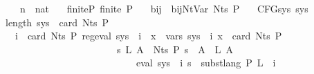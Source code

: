 \begin{isabellebody}
\ \ \ {\isasymgamma}{\isacharprime}{\kern0pt}\ {\isacharcolon}{\kern0pt}{\isacharcolon}{\kern0pt}\ {\isachardoublequoteopen}{\isacharprime}{\kern0pt}n\ {\isasymRightarrow}\ nat{\isachardoublequoteclose}\isanewline
\ \ \ finite{\isacharunderscore}{\kern0pt}P{\isacharcolon}{\kern0pt}\ {\isachardoublequoteopen}finite\ P{\isachardoublequoteclose}\isanewline
\ \ \ bij{\isacharunderscore}{\kern0pt}{\isasymgamma}{\isacharunderscore}{\kern0pt}{\isasymgamma}{\isacharprime}{\kern0pt}{\isacharcolon}{\kern0pt}\ \ {\isachardoublequoteopen}bij{\isacharunderscore}{\kern0pt}Nt{\isacharunderscore}{\kern0pt}Var\ {\isacharparenleft}{\kern0pt}Nts\ P{\isacharparenright}{\kern0pt}\ {\isasymgamma}\ {\isasymgamma}{\isacharprime}{\kern0pt}{\isachardoublequoteclose}\isanewline
{}\isanewline
\isanewline
{}\isamarkupfalse%
\ {\isachardoublequoteopen}CFG{\isacharunderscore}{\kern0pt}sys\ sys\ {\isasymequiv}\isanewline
\ \ length\ sys\ {\isacharequal}{\kern0pt}\ card\ {\isacharparenleft}{\kern0pt}Nts\ P{\isacharparenright}{\kern0pt}\ {\isasymand}\isanewline
\ \ \ \ {\isacharparenleft}{\kern0pt}{\isasymforall}i\ {\isacharless}{\kern0pt}\ card\ {\isacharparenleft}{\kern0pt}Nts\ P{\isacharparenright}{\kern0pt}{\isachardot}{\kern0pt}\ reg{\isacharunderscore}{\kern0pt}eval\ {\isacharparenleft}{\kern0pt}sys\ {\isacharbang}{\kern0pt}\ i{\isacharparenright}{\kern0pt}\ {\isasymand}\ {\isacharparenleft}{\kern0pt}{\isasymforall}x\ {\isasymin}\ vars\ {\isacharparenleft}{\kern0pt}sys\ {\isacharbang}{\kern0pt}\ i{\isacharparenright}{\kern0pt}{\isachardot}{\kern0pt}\ x\ {\isacharless}{\kern0pt}\ card\ {\isacharparenleft}{\kern0pt}Nts\ P{\isacharparenright}{\kern0pt}{\isacharparenright}{\kern0pt}\isanewline
\ \ \ \ \ \ \ \ \ \ \ \ \ \ \ \ \ \ \ \ \ \ \ \ {\isasymand}\ {\isacharparenleft}{\kern0pt}{\isasymforall}s\ L{\isachardot}{\kern0pt}\ {\isacharparenleft}{\kern0pt}{\isasymforall}A\ {\isasymin}\ Nts\ P{\isachardot}{\kern0pt}\ s\ {\isacharparenleft}{\kern0pt}{\isasymgamma}{\isacharprime}{\kern0pt}\ A{\isacharparenright}{\kern0pt}\ {\isacharequal}{\kern0pt}\ L\ A{\isacharparenright}{\kern0pt}\isanewline
\ \ \ \ \ \ \ \ \ \ \ \ \ \ \ \ \ \ \ \ \ \ \ \ \ \ \ \ {\isasymlongrightarrow}\ eval\ {\isacharparenleft}{\kern0pt}sys\ {\isacharbang}{\kern0pt}\ i{\isacharparenright}{\kern0pt}\ s\ {\isacharequal}{\kern0pt}\ subst{\isacharunderscore}{\kern0pt}lang\ P\ L\ {\isacharparenleft}{\kern0pt}{\isasymgamma}\ i{\isacharparenright}{\kern0pt}{\isacharparenright}{\kern0pt}{\isacharparenright}{\kern0pt}{\isachardoublequoteclose}\isanewline

\end{isabellebody}
